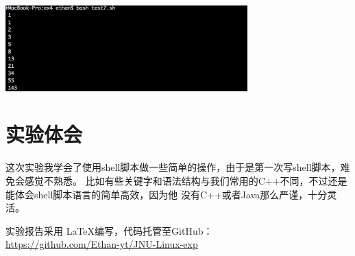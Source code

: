 \documentclass{JNUexp}
\begin{document}
\begin{answer}
    
\end{answer}

\begin{image}
    \includegraphics[width=0.7\textwidth]{6}
\end{image}


\section{实验体会}

这次实验我学会了使用shell脚本做一些简单的操作，由于是第一次写shell脚本，难免会感觉不熟悉。
比如有些关键字和语法结构与我们常用的C++不同，不过还是能体会shell脚本语言的简单高效，因为他
没有C++或者Java那么严谨，十分灵活。\\
\vfill

实验报告采用 \LaTeX 编写，代码托管至GitHub：\\
\url{https://github.com/Ethan-yt/JNU-Linux-exp}
\end{document}
